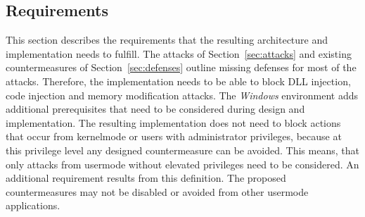 \subsection{Requirements}
This section describes the requirements that the resulting architecture and implementation needs to fulfill. The attacks of Section~\ref{sec:attacks} and existing countermeasures of Section~\ref{sec:defenses} outline missing defenses for most of the attacks. Therefore, the implementation needs to be able to block \gls{DLL} injection, code injection and memory modification attacks. The \emph{Windows} environment adds additional prerequisites that need to be considered during design and implementation. The resulting implementation does not need to block actions that occur from kernelmode or users with administrator privileges, because at this privilege level any designed countermeasure can be avoided. This means, that only attacks from usermode without elevated privileges need to be considered. An additional requirement results from this definition. The proposed countermeasures may not be disabled or avoided from other usermode applications.